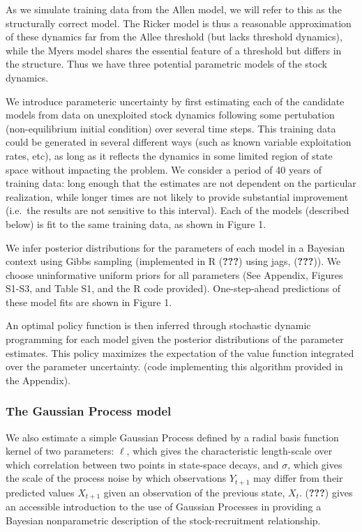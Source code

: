 \documentclass[author-year, review]{elsarticle} %
\begin{document}
As we simulate training data from the Allen model, we will refer to this
as the structurally correct model. The Ricker model is thus a reasonable
approximation of these dynamics far from the Allee threshold (but lacks
threshold dynamics), while the Myers model shares the essential feature
of a threshold but differs in the structure. Thus we have three
potential parametric models of the stock dynamics.

We introduce parameteric uncertainty by first estimating each of the
candidate models from data on unexploited stock dynamics following some
pertubation (non-equilibrium initial condition) over several time steps.
This training data could be generated in several different ways (such as
known variable exploitation rates, etc), as long as it reflects the
dynamics in some limited region of state space without impacting the
problem. We consider a period of 40 years of training data: long enough
that the estimates are not dependent on the particular realization,
while longer times are not likely to provide substantial improvement
(i.e.~the results are not sensitive to this interval). Each of the
models (described below) is fit to the same training data, as shown in
Figure 1.

We infer posterior distributions for the parameters of each model in a
Bayesian context using Gibbs sampling (implemented in R ({\textbf{???}})
using jags, ({\textbf{???}})). We choose uninformative uniform priors
for all parameters (See Appendix, Figures S1-S3, and Table S1, and the R
code provided). One-step-ahead predictions of these model fits are shown
in Figure 1.

An optimal policy function is then inferred through stochastic dynamic
programming for each model given the posterior distributions of the
parameter estimates. This policy maximizes the expectation of the value
function integrated over the parameter uncertainty. (code implementing
this algorithm provided in the Appendix).

\subsubsection{The Gaussian Process
model}\label{the-gaussian-process-model}

We also estimate a simple Gaussian Process defined by a radial basis
function kernel of two parameters: $\ell$, which gives the
characteristic length-scale over which correlation between two points in
state-space decays, and $\sigma$, which gives the scale of the process
noise by which observations $Y_{t+1}$ may differ from their predicted
values $X_{t+1}$ given an observation of the previous state, $X_t$.
({\textbf{???}}) gives an accessible introduction to the use of Gaussian
Processes in providing a Bayesian nonparametric description of the
stock-recruitment relationship.
\end{document}
